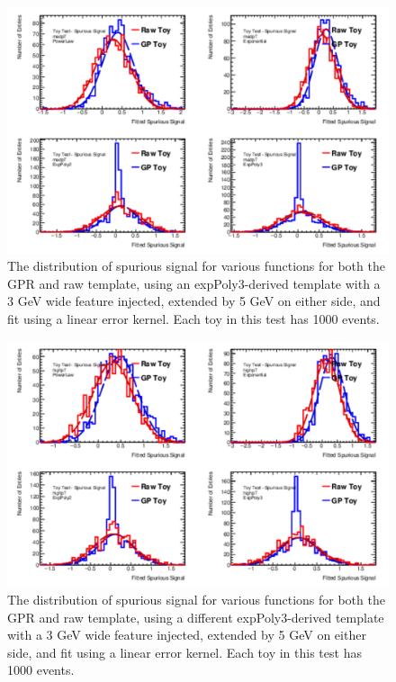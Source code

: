 \begin{figure} 
\begin{center}
  \includegraphics[width=\textwidth]{figures/background/gpr/validation/linear/ToyTest_FitSigVals_medpT_1000_Sig}   
\caption{The distribution of spurious signal for various functions for both the GPR and raw template, using an expPoly3-derived template with a 3 GeV wide feature injected, extended by 5 GeV on either side, and fit using a linear error kernel. Each toy in this test has 1000 events.}
\label{fig:linearkernel_medpt_1000_Sig}
\end{center}
\end{figure}

\begin{figure} 
\begin{center}
  \includegraphics[width=\textwidth]{figures/background/gpr/validation/linear/ToyTest_FitSigVals_highpT_1000_Sig}   
\caption{The distribution of spurious signal for various functions for both the GPR and raw template, using a different expPoly3-derived template with a 3 GeV wide feature injected, extended by 5 GeV on either side, and fit using a linear error kernel. Each toy in this test has 1000 events.}
\label{fig:linearkernel_highpt_1000_Sig}
\end{center}
\end{figure}

